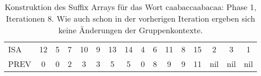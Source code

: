 \begin{table}[H]
\begin{adjustbox}{max width=\textwidth}
\begin{tabular}{lccccccccccccccc}
\multicolumn{1}{l|}{ISA}     & 12                      & 5  & 7                       & 10                         & 9                           & 13                        & 14                         & 4                         & 6                        & 11 & 8                       & 15  & 2   & 3   & 1   \\
\multicolumn{1}{l|}{PREV}    & 0                       & 0  & 2                       & 3                          & 3                           & 5                         & 5                          & \cellcolor[HTML]{\red}0 & 8                        & 9  & 9                       & 11  & nil & nil & nil
\end{tabular}
\end{adjustbox}

\caption[Konstruktion des Suffix Arrays f{\"u}r das Wort caabaccaabacaa: Phase 1, Iterationen 8]{Konstruktion des Suffix Arrays f{\"u}r das Wort caabaccaabacaa: Phase 1, Iterationen 8. Wie auch schon in der vorherigen Iteration ergeben sich keine {\"A}nderungen der Gruppenkontexte.}
\label{table_complex_example_1_8} 
\end{table}

